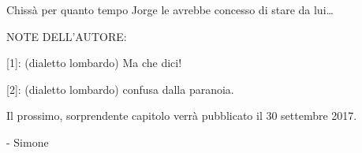 Chissà per quanto tempo Jorge le avrebbe concesso di stare da lui\ldots


NOTE DELL'AUTORE:

[1]: (dialetto lombardo) Ma che dici!

[2]: (dialetto lombardo) confusa dalla paranoia.


Il prossimo, sorprendente capitolo verrà pubblicato il 30 settembre 2017.

- Simone



